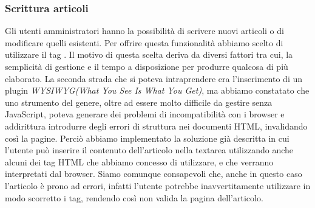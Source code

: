 \documentclass[12pt]{article}
\begin{document}
	\subsubsection{Scrittura articoli}
	Gli utenti amministratori hanno la possibilità di scrivere nuovi articoli o di modificare quelli esistenti. Per offrire questa funzionalità abbiamo scelto di utilizzare il tag \emph{}. Il motivo di questa scelta deriva da diversi fattori tra cui, la semplicità di gestione e il tempo a disposizione per produrre qualcosa di più elaborato. La seconda strada che si poteva intraprendere era l'inserimento di un plugin \emph{WYSIWYG(What You See Is What You Get)}, ma abbiamo constatato che uno strumento del genere, oltre ad essere molto difficile da gestire senza JavaScript, poteva generare dei problemi di incompatibilità con i browser e addirittura introdurre degli errori di struttura nei documenti HTML, invalidando così la pagine. Perciò abbiamo implementato la soluzione già descritta in cui l'utente può inserire il contenuto dell'articolo nella textarea utilizzando anche alcuni dei tag HTML che abbiamo concesso di utilizzare, e che verranno interpretati dal browser. Siamo comunque consapevoli che, anche in questo caso l'articolo è prono ad errori, infatti l'utente potrebbe inavvertitamente utilizzare in modo scorretto i tag, rendendo così non valida la pagina dell'articolo.
\end{document}
